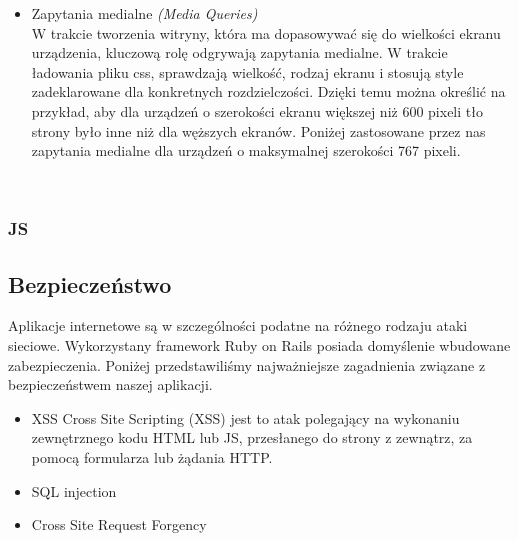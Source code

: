 \begin{itemize}
          \item Zapytania medialne \emph{(Media Queries)}\\
            W trakcie tworzenia witryny, która ma dopasowywać się do wielkości ekranu urządzenia, kluczową rolę odgrywają zapytania medialne. W trakcie ładowania pliku css, sprawdzają wielkość, rodzaj ekranu i stosują style zadeklarowane dla konkretnych rozdzielczości. Dzięki temu można określić na przykład, aby dla urządzeń o szerokości ekranu większej niż 600 pixeli tło strony było inne niż dla węższych ekranów.
            Poniżej zastosowane przez nas zapytania medialne dla urządzeń o maksymalnej szerokości 767 pixeli.
            \begin{code}
              
            \end{code}\\
        \end{itemize}
      \subsubsection{JS}
    \clearpage
    \subsection{Bezpieczeństwo}
    Aplikacje internetowe są w szczególności podatne na różnego rodzaju ataki sieciowe. Wykorzystany framework Ruby on Rails posiada domyślenie wbudowane zabezpieczenia. Poniżej przedstawiliśmy najważniejsze zagadnienia związane z bezpieczeństwem naszej aplikacji.
      \begin{itemize}
        \item XSS
        Cross Site Scripting (XSS) jest to atak polegający na wykonaniu zewnętrznego kodu HTML lub JS, przesłanego do strony z zewnątrz, za pomocą formularza lub żądania HTTP.\\

        

        \item SQL injection
        \item Cross Site Request Forgency
      \end{itemize}

